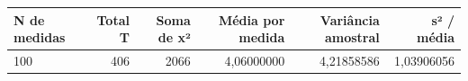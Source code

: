 \begin{tabular}{lrrrrr}
\toprule
N de medidas & Total T & Soma de x² & Média por medida & Variância amostral & s² / média \\
\midrule
100 & 406 & 2066 & 4,06000000 & 4,21858586 & 1,03906056 \\
\bottomrule
\end{tabular}
